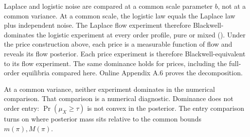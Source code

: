 Laplace and logistic noise are compared at a common scale parameter \(b\), not at a common variance.
At a common scale, the logistic law equals the Laplace law plus independent noise.
The Laplace flow experiment therefore Blackwell-dominates the logistic experiment at every order profile, pure or mixed
().
Under the price construction above, each price is a measurable function of flow and reveals its flow posterior.
Each price experiment is therefore Blackwell-equivalent to its flow experiment.
The same dominance holds for prices, including the full-order equilibria compared here.
Online Appendix A.6 proves the decomposition.
\par
At a common variance, neither experiment dominates in the numerical comparison.
That comparison is a numerical diagnostic.
Dominance does not order entry: \(\Pr(\mu_X\ge\tau)\) is not convex in the posterior.
The entry comparison turns on where posterior mass sits relative to the common bounds \(m(\pi),M(\pi)\).
